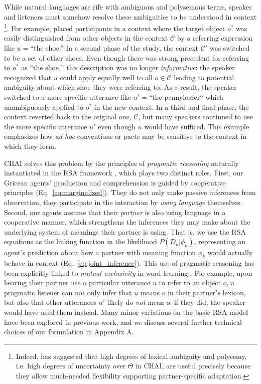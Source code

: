 While natural languages are rife with ambiguous and polysemous terms, speaker and listeners must somehow resolve these ambiguities to be understood in context \cite{PiantadosiTilyGibson12_Ambiguity}\footnote{Indeed,  has suggested that high degrees of lexical ambiguity and polysemy, i.e. high degrees of uncertainty over $\Theta$ in CHAI, are useful precisely because they allow much-needed flexibility supporting partner-specific adaptation.}. 
For example,  placed participants in a context where the target object $o^*$ was easily distinguished from other objects in the context $\mathcal{C}$ by a referring expression like $u=$``the shoe.''
In a second phase of the study, the context $\mathcal{C}'$ was switched to be a set of other shoes.
Even though there was strong precedent for referring to $o^*$ as ``the shoe,'' this description was no longer \emph{informative}: the speaker recognized that $u$ could apply equally well to all $o\in\mathcal{C}$ leading to potential ambiguity about which shoe they were referring to.
As a result, the speaker switched to a more specific utterance like $u'=$``the pennyloafer`` which unambiguously applied to $o^*$ in the new context.
In a third and final phase, the context reverted back to the original one, $\mathcal{C}$, but many speakers continued to use the more specific utterance $u'$ even though $u$ would have sufficed.
This example emphasizes how \emph{ad hoc} conventions or pacts may be sensitive to the context in which they form.

CHAI solves this problem by the principles of \textit{pragmatic reasoning} naturally instantiated in the RSA framework \cite{FrankGoodman12_PragmaticReasoningLanguageGames}, which plays two distinct roles.
First, our Gricean agents'  production and comprehension is guided by cooperative principles (Eq.~\ref{eq:marginalized}).
They do not only make passive inferences from observation, they participate in the interaction by \emph{using language} themselves.
Second, our agents assume that their \emph{partner} is also using language in a cooperative manner, which strengthens the inferences they may make about the underlying system of meanings their partner is using.
That is, we use the RSA equations as the linking function in the likelihood $P(D_k | \phi_k)$, representing an agent's prediction about how a partner with meaning function $\phi_k$ would actually behave in context (Eq.~\ref{eq:joint_inference}). 
This use of pragmatic reasoning has been explicitly linked to \emph{mutual exclusivity} in word learning \cite{bloom2002children,FrankGoodmanTenenbaum09_Wurwur,SmithGoodmanFrank13_RecursivePragmaticReasoningNIPS,gulordava2020one,ohmerreinforcement}.
For example, upon hearing their partner use a particular utterance $u$ to refer to an object $o$, a pragmatic listener can not only infer that $u$ means $o$ in their partner's lexicon, but also that other utterances $u'$ likely do \emph{not} mean $o$: if they did, the speaker would have used them instead.
Many minor variations on the basic RSA model have been explored in previous work, and we discuss several further technical choices of our formulation in Appendix A.

